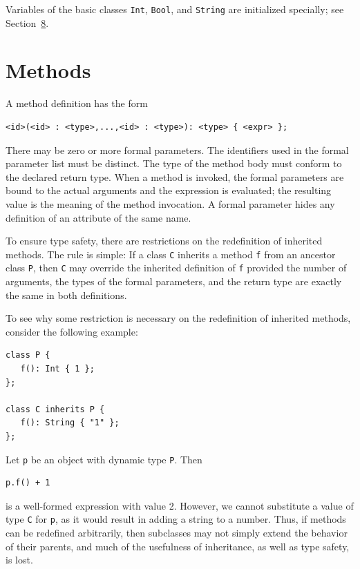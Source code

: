 \documentclass[]{article}
\begin{document}
Variables of the basic classes \texttt{Int}, \texttt{Bool}, and
\texttt{String} are initialized specially; see
Section~\href{node26.html\#sec-basic}{8}.

\section{Methods}

A method definition has the form

\begin{verbatim}
<id>(<id> : <type>,...,<id> : <type>): <type> { <expr> };
\end{verbatim}

There may be zero or more formal parameters. The identifiers used in the
formal parameter list must be distinct. The type of the method body must
conform to the declared return type. When a method is invoked, the
formal parameters are bound to the actual arguments and the expression
is evaluated; the resulting value is the meaning of the method
invocation. A formal parameter hides any definition of an attribute of
the same name.

To ensure type safety, there are restrictions on the redefinition of
inherited methods. The rule is simple: If a class \texttt{C} inherits a
method \texttt{f} from an ancestor class \texttt{P}, then \texttt{C} may
override the inherited definition of \texttt{f} provided the number of
arguments, the types of the formal parameters, and the return type are
exactly the same in both definitions.

To see why some restriction is necessary on the redefinition of
inherited methods, consider the following example:

\begin{verbatim}
class P {
   f(): Int { 1 };
};

class C inherits P {
   f(): String { "1" };
};
\end{verbatim}

Let \texttt{p} be an object with dynamic type \texttt{P}. Then

\begin{verbatim}
p.f() + 1
\end{verbatim}

is a well-formed expression with value 2. However, we cannot substitute
a value of type \texttt{C} for \texttt{p}, as it would result in adding
a string to a number. Thus, if methods can be redefined arbitrarily,
then subclasses may not simply extend the behavior of their parents, and
much of the usefulness of inheritance, as well as type safety, is lost.
\end{document}
